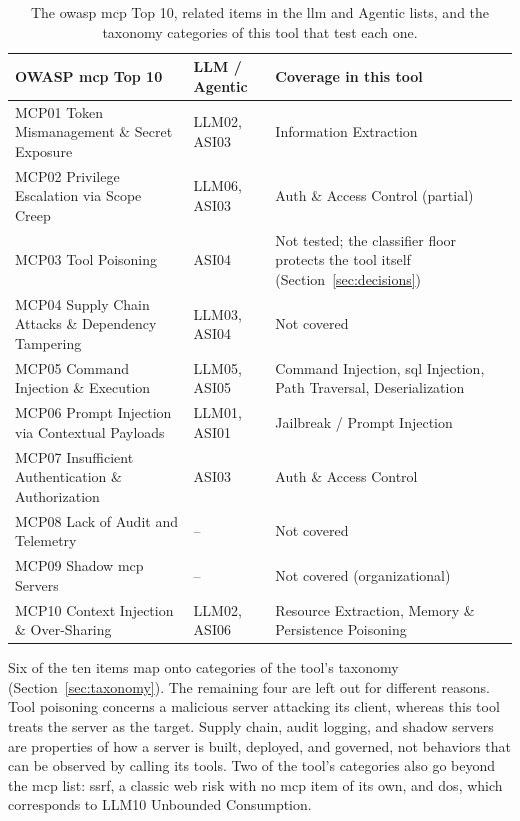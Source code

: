 \begin{table}[htbp]
\centering
\small
\begin{tabular}{>{\raggedright\arraybackslash}p{5.0cm} >{\raggedright\arraybackslash}p{2.3cm} >{\raggedright\arraybackslash}p{6.2cm}}
\hline
\textbf{OWASP \acrshort{mcp} Top 10} & \textbf{LLM / Agentic} & \textbf{Coverage in this tool} \\
\hline
MCP01 Token Mismanagement \& Secret Exposure & LLM02, ASI03 & Information Extraction \\
MCP02 Privilege Escalation via Scope Creep & LLM06, ASI03 & Auth \& Access Control (partial) \\
MCP03 Tool Poisoning & ASI04 & Not tested; the classifier floor protects the tool itself (Section~\ref{sec:decisions}) \\
MCP04 Supply Chain Attacks \& Dependency Tampering & LLM03, ASI04 & Not covered \\
MCP05 Command Injection \& Execution & LLM05, ASI05 & Command Injection, \acrshort{sql} Injection, Path Traversal, Deserialization \\
MCP06 Prompt Injection via Contextual Payloads & LLM01, ASI01 & Jailbreak / Prompt Injection \\
MCP07 Insufficient Authentication \& Authorization & ASI03 & Auth \& Access Control \\
MCP08 Lack of Audit and Telemetry & -- & Not covered \\
MCP09 Shadow \acrshort{mcp} Servers & -- & Not covered (organizational) \\
MCP10 Context Injection \& Over-Sharing & LLM02, ASI06 & Resource Extraction, Memory \& Persistence Poisoning \\
\hline
\end{tabular}
\caption{The \gls{owasp} \gls{mcp} Top 10, related items in the \gls{llm} and Agentic lists, and the taxonomy categories of this tool that test each one.}
\label{tab:owasp-mcp}
\end{table}

Six of the ten items map onto categories of the tool's taxonomy (Section~\ref{sec:taxonomy}). The remaining four are left out for different reasons. Tool poisoning concerns a malicious server attacking its client, whereas this tool treats the server as the target. Supply chain, audit logging, and shadow servers are properties of how a server is built, deployed, and governed, not behaviors that can be observed by calling its tools. Two of the tool's categories also go beyond the \gls{mcp} list: \acrshort{ssrf}, a classic web risk with no \gls{mcp} item of its own, and \acrshort{dos}, which corresponds to LLM10 Unbounded Consumption.

